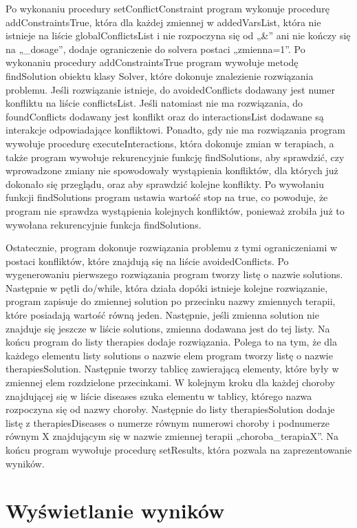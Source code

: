 Po wykonaniu procedury setConflictConstraint program wykonuje procedurę addConstraintsTrue, która dla każdej zmiennej w addedVarsList, która nie istnieje na liście globalConflictsList i nie rozpoczyna się od „\&” ani nie kończy się na „\_dosage”, dodaje ograniczenie do solvera postaci „zmienna=1”. Po wykonaniu procedury addConstraintsTrue program wywołuje metodę findSolution obiektu klasy Solver, które dokonuje znalezienie rozwiązania problemu. Jeśli rozwiązanie istnieje, do avoidedConflicts dodawany jest numer konfliktu na liście conflictsList. Jeśli natomiast nie ma rozwiązania, do foundConflicts dodawany jest konflikt oraz do interactionsList dodawane są interakcje odpowiadające konfliktowi. Ponadto, gdy nie ma rozwiązania program wywołuje procedurę executeInteractions, która dokonuje zmian w terapiach, a także program wywołuje rekurencyjnie funkcję findSolutions, aby sprawdzić, czy wprowadzone zmiany nie spowodowały wystąpienia konfliktów, dla których już dokonało się przeglądu, oraz aby sprawdzić kolejne konflikty. Po wywołaniu funkcji findSolutions program ustawia wartość stop na true, co powoduje, że program nie sprawdza wystąpienia kolejnych konfliktów, ponieważ zrobiła już to wywołana rekurencyjnie funkcja findSolutions. 

Ostatecznie, program dokonuje rozwiązania problemu z tymi ograniczeniami w postaci konfliktów, które znajdują się na liście avoidedConflicts. Po wygenerowaniu pierwszego rozwiązania program tworzy listę o nazwie solutions. Następnie w pętli do/while, która działa dopóki istnieje kolejne rozwiązanie, program zapisuje do zmiennej solution po przecinku nazwy zmiennych terapii, które posiadają wartość równą jeden. Następnie, jeśli zmienna solution nie znajduje się jeszcze w liście solutions, zmienna dodawana jest do tej listy. Na końcu program do listy therapies dodaje rozwiązania. Polega to na tym, że dla każdego elementu listy solutions o nazwie elem program tworzy listę o nazwie therapiesSolution. Następnie tworzy tablicę zawierającą elementy, które były w zmiennej elem rozdzielone przecinkami. W kolejnym kroku dla każdej choroby znajdującej się w liście diseases szuka elementu w tablicy, którego nazwa rozpoczyna się od nazwy choroby. Następnie do listy therapiesSolution dodaje listę z therapiesDiseases o numerze równym numerowi choroby i podnumerze równym X znajdującym się w nazwie zmiennej terapii „choroba\_terapiaX”. Na końcu program wywołuje procedurę setResults, która pozwala na zaprezentowanie wyników. 

\section{Wyświetlanie wyników}

